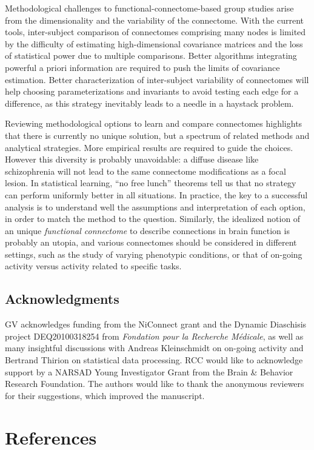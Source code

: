 \documentclass[5p]{elsarticle}
\begin{document}
Methodological challenges to functional-connectome-based group studies
arise from the dimensionality and the variability of the connectome. With
the current tools, inter-subject comparison of connectomes comprising
many nodes is limited by the difficulty of estimating high-dimensional
covariance matrices and the loss of statistical power due to multiple
comparisons. Better algorithms integrating powerful a priori information are required
to push the limits of covariance estimation. Better characterization of
inter-subject variability of connectomes \cite{kelly2012} will help
choosing parameterizations and invariants to avoid testing each edge for
a difference, as this strategy inevitably leads to a needle in a haystack
problem.

Reviewing methodological options to learn and compare connectomes
highlights that there is currently no unique solution, but a spectrum of
related methods and analytical strategies. More empirical results are
required to guide the choices. However this diversity is probably
unavoidable: a diffuse disease like schizophrenia will not lead to the
same connectome modifications as a focal lesion. In statistical learning,
``no free lunch'' theorems \cite{wolpert1996} tell us that no strategy
can perform uniformly better in all situations. In practice, the key to a
successful analysis is to understand well the assumptions and
interpretation of each option, in order to match the method to the
question. Similarly, the idealized notion of an unique \emph{functional
connectome} to describe connections in brain function is probably an
utopia, and various connectomes should be considered in different
settings, such as the study of varying phenotypic conditions, or that of
on-going activity versus activity related to specific tasks.

\subsection*{Acknowledgments}

GV acknowledges funding from the NiConnect grant and the Dynamic
Diaschisis project DEQ20100318254 from \emph{Fondation pour la Recherche
M\'edicale}, as well as many insightful discussions with Andreas
Kleinschmidt on on-going activity and Bertrand Thirion on statistical
data processing. RCC would like to acknowledge support by a NARSAD Young
Investigator Grant from the Brain \& Behavior Research Foundation.
The authors would like to thank the anonymous reviewers
for their suggestions, which improved the manuscript.


{
\section*{References}
\small
%

 }

\end{document}
